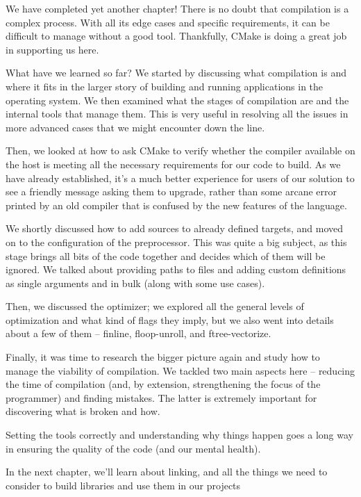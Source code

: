 
We have completed yet another chapter! There is no doubt that compilation is a complex process. With all its edge cases and specific requirements, it can be difficult to manage without a good tool. Thankfully, CMake is doing a great job in supporting us here.

What have we learned so far? We started by discussing what compilation is and where it fits in the larger story of building and running applications in the operating system. We then examined what the stages of compilation are and the internal tools that manage them. This is very useful in resolving all the issues in more advanced cases that we might encounter down the line.

Then, we looked at how to ask CMake to verify whether the compiler available on the host is meeting all the necessary requirements for our code to build. As we have already established, it's a much better experience for users of our solution to see a friendly message asking them to upgrade, rather than some arcane error printed by an old compiler that is confused by the new features of the language.

We shortly discussed how to add sources to already defined targets, and moved on to the configuration of the preprocessor. This was quite a big subject, as this stage brings all bits of the code together and decides which of them will be ignored. We talked about providing paths to files and adding custom definitions as single arguments and in bulk (along with some use cases).

Then, we discussed the optimizer; we explored all the general levels of optimization and what kind of flags they imply, but we also went into details about a few of them – finline, floop-unroll, and ftree-vectorize.

Finally, it was time to research the bigger picture again and study how to manage the viability of compilation. We tackled two main aspects here – reducing the time of compilation (and, by extension, strengthening the focus of the programmer) and finding mistakes. The latter is extremely important for discovering what is broken and how.

Setting the tools correctly and understanding why things happen goes a long way in ensuring the quality of the code (and our mental health).

In the next chapter, we'll learn about linking, and all the things we need to consider to build libraries and use them in our projects



